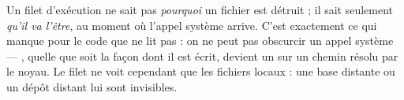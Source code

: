 \begin{pourquoi}
Un filet d'exécution ne sait pas \emph{pourquoi} un fichier est détruit ; il sait
seulement \emph{qu'il va l'être}, au moment où l'appel système arrive. C'est exactement ce
qui manque pour le code que \demo{} ne lit pas : on ne peut pas obscurcir un appel
système --- , quelle que soit la façon dont il est écrit, devient un 
sur un chemin résolu par le noyau. Le filet ne voit cependant que les fichiers locaux : une
base distante ou un dépôt distant lui sont invisibles.
\end{pourquoi}
